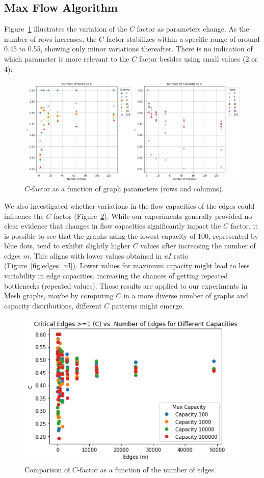 \documentclass{article}
\begin{document}
\subsection{Max Flow Algorithm}

Figure~\ref{fig:Cfactor} illustrates the variation of the \(C\) factor as parameters change. As the number of rows increases, the \(C\) factor stabilizes within a specific range of around 0.45 to 0.55, showing only minor variations thereafter. There is no indication of which parameter is more relevant to the \(C\) factor besides using small values (2 or 4):

\begin{figure}[H]
\centering
\includegraphics[width=1.0\linewidth]{Cfactor.png}
\caption{\(C\)-factor as a function of graph parameters (rows and columns).}
\label{fig:Cfactor}
\end{figure}

We also investigated whether variations in the flow capacities of the edges could influence the \(C\) factor (Figure~\ref{fig:edgesCfactor}). While our experiments generally provided no clear evidence that changes in flow capacities significantly impact the \(C\) factor, it is possible to see that the graphs using the lowest capacity of 100, represented by blue dots, tend to exhibit slightly higher \(C\) values after increasing the number of edges \(m\). This aligns with lower values obtained in \(uI\) ratio (Figure~\ref{fig:edges_uI}). Lower values for maximum capacity might lead to less variability in edge capacities, increasing the chances of getting repeated bottlenecks (repeated values). Those results are applied to our experiments in Mesh graphs, maybe by computing \(C\) in a more diverse number of graphs and capacity distributions, different \(C\) patterns might emerge.

\begin{figure}[H]
\centering
\includegraphics[width=0.6\linewidth]{edges_C.png}
\caption{Comparison of \(C\)-factor as a function of the number of edges.}
\label{fig:edgesCfactor}
\end{figure}
\end{document}
